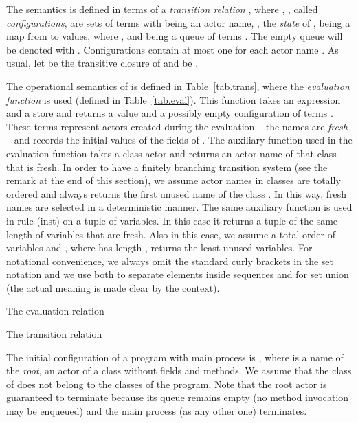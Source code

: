 \documentclass{LMCS}
\theoremstyle{plain}\newtheorem{proposition}[thm]{Proposition}
\theoremstyle{plain}\newtheorem{lemma}[thm]{Lemma}
\theoremstyle{plain}\newtheorem{theorem}[thm]{Theorem}
\theoremstyle{plain}\newtheorem{corollary}[thm]{Corollary}
\newcommand{\rulename}[1]{{\sc(#1)}}
\newcommand{\actor}{}
\begin{document}
The semantics is defined in terms of a \emph{transition relation}
, where , , called \emph{configurations}, are
 sets of terms  with 
 being an actor name,
, the \emph{state} of , being a map from  to values, 
where ,
and  being a queue of terms . 
The empty queue will be denoted with .
Configurations contain at most one 
for each actor name . As usual, let  be the transitive closure of 
 and  be .



The operational semantics of {\actor} is defined in 
Table~\ref{tab.trans}, where the \emph{evaluation function} 
 is used (defined in Table~\ref{tab.eval}). This function 
takes an expression  and a
store  and returns a value  and a possibly empty configuration 
of terms . These 
terms represent actors  created during the evaluation -- the names  are \emph{fresh} --
and  records the initial values of the fields of .
The auxiliary function  used in the evaluation function
takes a class actor and returns an actor name of that class that is fresh.
In order to have a finitely branching transition system (see the remark
at the end of this section), we assume actor names 
in classes are totally ordered and  always
returns the first unused name of the class . In this way,
fresh names are selected in a deterministic manner.  
The same auxiliary function is used in rule \rulename{inst} 
 on a tuple of variables. In this case it returns a 
tuple of the same length of variables that are fresh. Also in this case, we
assume a total order of variables and , where  has length , returns the least  unused variables.  
For notational convenience, we  always
omit the standard curly brackets in the set notation
and we use  both to separate elements inside 
sequences and for set union (the actual meaning is made
clear by the context).
\begin{table} 

\caption{\label{tab.eval} The evaluation relation }
\end{table}


\begin{table} 

\caption{\label{tab.trans} The transition relation }
\end{table}


The initial configuration of a program with main process   is
, where  is a
name of the \emph{root}, an actor of a class
without fields and methods. We assume that the class of  does not
belong to the classes of the program. 
Note that the root actor is guaranteed to terminate because its queue remains empty
(no method invocation may be enqueued) and the main process (as any other
one) terminates.
\end{document}
